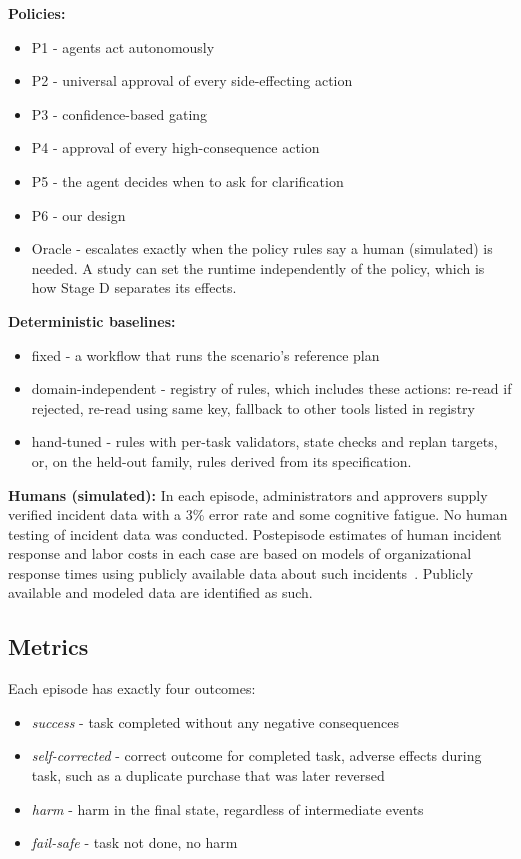 \documentclass[letterpaper,twocolumn,10pt]{article}
\begin{document}
\textbf{Policies:}

\begin{itemize}
\item P1 - agents act autonomously
\item P2 - universal approval of every side-effecting action
\item P3 - confidence-based gating
\item P4 - approval of every high-consequence action
\item P5 - the agent decides when to ask for clarification
\item P6 - our design
\item Oracle - escalates exactly when the policy rules say a human (simulated) is needed. A study can set the runtime independently of the policy, which is how Stage D separates its effects.
\end{itemize}

\textbf{Deterministic baselines:}

\begin{itemize}
\item fixed - a workflow that runs the scenario's reference plan
\item domain-independent - registry of rules, which includes these actions: re-read if rejected, re-read using same key, fallback to other tools listed in registry
\item hand-tuned - rules with per-task validators, state checks and replan targets, or, on the held-out family, rules derived from its specification.
\end{itemize}

\textbf{Humans (simulated):} In each episode, administrators and approvers supply verified incident data with a 3\% error rate and some cognitive fatigue. No human testing of incident data was conducted. Postepisode estimates of human incident response and labor costs in each case are based on models of organizational response times using publicly available data about such incidents~\cite{verica2022void,pagerduty2021digitalops}. Publicly available and modeled data are identified as such.

\subsection{Metrics}\label{sec:6.5}

Each episode has exactly four outcomes:

\begin{itemize}
\item \emph{success} - task completed without any negative consequences
\item \emph{self-corrected} - correct outcome for completed task, adverse effects during task, such as a duplicate purchase that was later reversed
\item \emph{harm} - harm in the final state, regardless of intermediate events
\item \emph{fail-safe} - task not done, no harm
\end{itemize}
\end{document}
